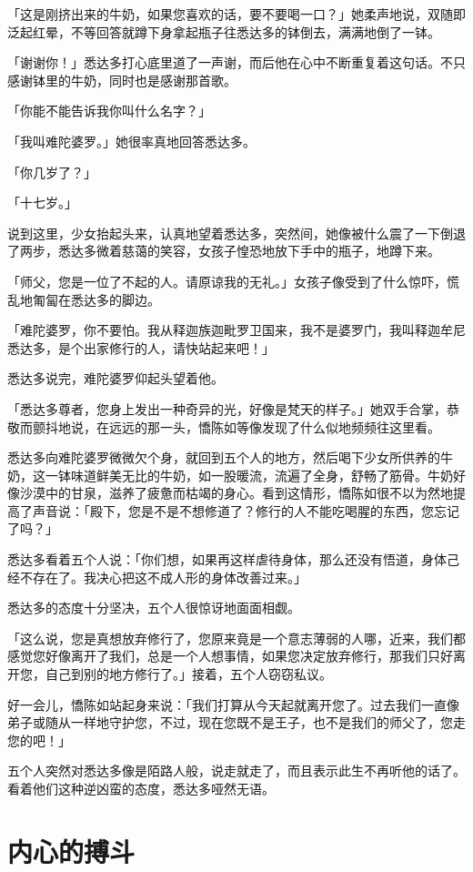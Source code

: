 \documentclass[twoside,openany]{book}
\begin{document}
「这是刚挤出来的牛奶，如果您喜欢的话，要不要喝一口？」她柔声地说，双随即泛起红晕，不等回答就蹲下身拿起瓶子往悉达多的钵倒去，满满地倒了一钵。

「谢谢你！」悉达多打心底里道了一声谢，而后他在心中不断重复着这句话。不只感谢钵里的牛奶，同时也是感谢那首歌。

「你能不能告诉我你叫什么名字？」

「我叫难陀婆罗。」她很率真地回答悉达多。

「你几岁了？」

「十七岁。」

说到这里，少女抬起头来，认真地望着悉达多，突然间，她像被什么震了一下倒退了两步，悉达多微着慈蔼的笑容，女孩子惶恐地放下手中的瓶子，地蹲下来。

「师父，您是一位了不起的人。请原谅我的无礼。」女孩子像受到了什么惊吓，慌乱地匍匐在悉达多的脚边。

「难陀婆罗，你不要怕。我从释迦族迦毗罗卫国来，我不是婆罗门，我叫释迦牟尼\textperiodcentered 悉达多，是个出家修行的人，请快站起来吧！」

悉达多说完，难陀婆罗仰起头望着他。

「悉达多尊者，您身上发出一种奇异的光，好像是梵天的样子。」她双手合掌，恭敬而颤抖地说，在远远的那一头，憍陈如等像发现了什么似地频频往这里看。

悉达多向难陀婆罗微微欠个身，就回到五个人的地方，然后喝下少女所供养的牛奶，这一钵味道鲜美无比的牛奶，如一股暖流，流遍了全身，舒畅了筋骨。牛奶好像沙漠中的甘泉，滋养了疲惫而枯竭的身心。看到这情形，憍陈如很不以为然地提高了声音说：「殿下，您是不是不想修道了？修行的人不能吃喝腥的东西，您忘记了吗？」

悉达多看着五个人说：「你们想，如果再这样虐待身体，那么还没有悟道，身体己经不存在了。我决心把这不成人形的身体改善过来。」

悉达多的态度十分坚决，五个人很惊讶地面面相觑。

「这么说，您是真想放弃修行了，您原来竟是一个意志薄弱的人哪，近来，我们都感觉您好像离开了我们，总是一个人想事情，如果您决定放弃修行，那我们只好离开您，自己到别的地方修行了。」接着，五个人窃窃私议。

好一会儿，憍陈如站起身来说：「我们打算从今天起就离开您了。过去我们一直像弟子或随从一样地守护您，不过，现在您既不是王子，也不是我们的师父了，您走您的吧！」

五个人突然对悉达多像是陌路人般，说走就走了，而且表示此生不再听他的话了。看着他们这种逆凶蛮的态度，悉达多哑然无语。

\section{内心的搏斗}\label{sec1.10}
\end{document}
